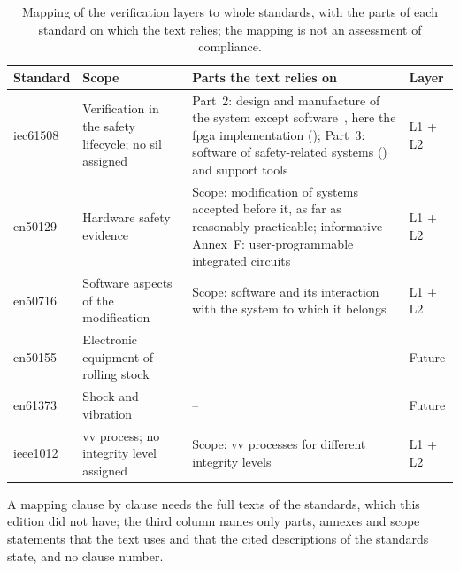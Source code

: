 \begin{table}[htbp]
	\centering
	\caption[Mapping of the Verification Layers to the Standards]{Mapping of the verification layers to whole standards, with the parts of each standard on which the text relies; the mapping is not an assessment of compliance.}
	\label{tab:standards_mapping}
	\small
	\begin{tabular}{@{}>{\raggedright\arraybackslash}p{} >{\raggedright\arraybackslash}p{} >{\raggedright\arraybackslash}p{} l@{}}
		\toprule
		Standard & Scope & Parts the text relies on & Layer \\
		\midrule
		\gls{iec61508}~\cite{iec61508_2010} & Verification in the safety lifecycle; no \gls{sil} assigned & Part~2: design and manufacture of the system except software~\cite{iec61508_2_2010}, here the \gls{fpga} implementation (\Cref{sec:standards_detail}); Part~3: software of safety-related systems (\Cref{sec:fpga_core_details}) and support tools~\cite{iec61508_3_2010} & L1 + L2 \\
		\gls{en50129}~\cite{en50129_2018} & Hardware safety evidence & Scope: modification of systems accepted before it, as far as reasonably practicable; informative Annex~F: user-programmable integrated circuits~\cite{en50129_2018} & L1 + L2 \\
		\gls{en50716}~\cite{en50716_2023} & Software aspects of the modification & Scope: software and its interaction with the system to which it belongs~\cite{en50716_2023} & L1 + L2 \\
		\gls{en50155}~\cite{en50155_2021} & Electronic equipment of rolling stock & -- & Future \\
		\gls{en61373}~\cite{en61373_2010} & Shock and vibration & -- & Future \\
		\gls{ieee1012}~\cite{ieee1012_2024} & \gls{vv} process; no integrity level assigned & Scope: \gls{vv} processes for different integrity levels~\cite{ieee1012_2024} & L1 + L2 \\
		\bottomrule
	\end{tabular}

	\medskip
	\begin{minipage}{0.95\textwidth}
		\footnotesize
		A mapping clause by clause needs the full texts of the standards, which this edition did not have; the third column names only parts, annexes and scope statements that the text uses and that the cited descriptions of the standards state, and no clause number.
	\end{minipage}
\end{table}

